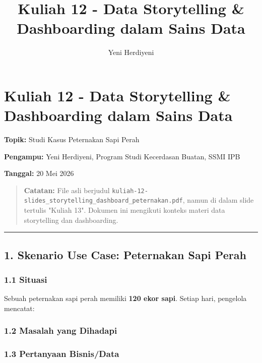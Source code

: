 \documentclass[12pt,a4paper]{article}
\begin{document}
\title{Kuliah 12 - Data Storytelling & Dashboarding dalam Sains Data}
\author{Yeni Herdiyeni}
\date{}
\maketitle

\maketitle
\tableofcontents
\newpage

\section{Kuliah 12 - Data Storytelling & Dashboarding dalam Sains Data}

\textbf{Topik:} Studi Kasus Peternakan Sapi Perah  

\textbf{Pengampu:} Yeni Herdiyeni, Program Studi Kecerdasan Buatan, SSMI IPB  

\textbf{Tanggal:} 20 Mei 2026


\begin{quote}
\textbf{Catatan:} File asli berjudul \texttt{kuliah-12-slides_storytelling_dashboard_peternakan.pdf}, namun di dalam slide tertulis "Kuliah 13". Dokumen ini mengikuti konteks materi data storytelling dan dashboarding.\end{quote}


\hrule


\subsection{1. Skenario Use Case: Peternakan Sapi Perah}

\subsubsection{1.1 Situasi}

Sebuah peternakan sapi perah memiliki \textbf{120 ekor sapi}. Setiap hari, pengelola mencatat:



\subsubsection{1.2 Masalah yang Dihadapi}


\subsubsection{1.3 Pertanyaan Bisnis/Data}
\end{document}
